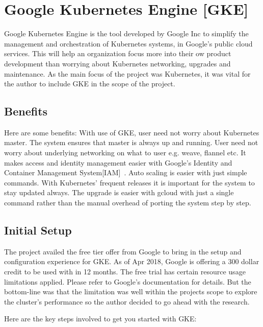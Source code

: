 \section{ Google Kubernetes Engine [GKE]}

Google Kubernetes Engine is the tool developed by Google Inc to simplify the
management and orchestration of Kubernetes systems, in Google's public cloud
services. This will help an organization focus more into their ow product
development than worrying about Kubernetes networking, upgrades and
maintenance. As the main focus of the project was Kubernetes, it was vital for
the author to include GKE in the scope of the project.

\subsection{Benefits}

Here are some benefits: With use of GKE, user need not worry about Kubernetes
master. The system ensures that master is always up and running. User need not
worry about underlying networking on what to user e.g. weave, flannel etc.  It
makes access and identity management easier with Google's Identity and
Container Management System[IAM]~\cite{hid-sp18-417-IAM}. Auto scaling is
easier with just simple commands. With Kubernetes' frequent releases it is
important for the system to stay updated always. The upgrade is easier with
gcloud with just a single command rather than the manual overhead of porting
the system step by step.

\subsection{Initial Setup}

The project availed the free tier offer from Google to bring in the setup and
configuration experience for GKE. As of Apr 2018, Google is offering a 300
dollar credit to be used with in 12 months. The free trial has certain
resource usage limitations applied. Please refer to Google's documentation for
details. But the bottom-line was that the limitation was well within the
projects scope to explore the cluster's performance so the author decided to
go ahead with the research.

Here are the key steps involved to get you started with GKE:


